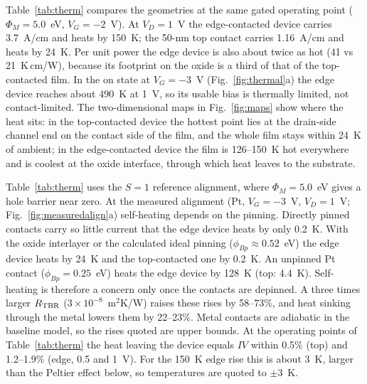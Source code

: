 Table~\ref{tab:therm} compares the geometries at the same gated operating point ($\Phi_M=5.0$~eV, $V_G=-2$~V). At $V_D=1$~V the edge-contacted device carries 3.7~A/cm and heats by 150~K; the 50-nm top contact carries 1.16~A/cm and heats by 24~K. Per unit power the edge device is also about twice as hot (41 vs 21~K\,cm/W), because its footprint on the oxide is a third of that of the top-contacted film. In the on state at $V_G=-3$~V (Fig.~\ref{fig:thermal}a) the edge device reaches about 490~K at 1~V, so its usable bias is thermally limited, not contact-limited. The two-dimensional maps in Fig.~\ref{fig:maps} show where the heat sits: in the top-contacted device the hottest point lies at the drain-side channel end on the contact side of the film, and the whole film stays within 24~K of ambient; in the edge-contacted device the film is 126--150~K hot everywhere and is coolest at the oxide interface, through which heat leaves to the substrate.

Table~\ref{tab:therm} uses the $S=1$ reference alignment, where $\Phi_M=5.0$~eV gives a hole barrier near zero. At the measured alignment (Pt, $V_G=-3$~V, $V_D=1$~V; Fig.~\ref{fig:measuredalign}a) self-heating depends on the pinning. Directly pinned contacts carry so little current that the edge device heats by only 0.2~K. With the oxide interlayer or the calculated ideal pinning ($\phi_{Bp}\approx0.52$~eV) the edge device heats by 24~K and the top-contacted one by 0.2~K. An unpinned Pt contact ($\phi_{Bp}=0.25$~eV) heats the edge device by 128~K (top: 4.4~K). Self-heating is therefore a concern only once the contacts are depinned. A three times larger $R_{\rm TBR}$ ($3\times10^{-8}$~m$^2$K/W) raises these rises by 58--73\%, and heat sinking through the metal lowers them by 22--23\%. Metal contacts are adiabatic in the baseline model, so the rises quoted are upper bounds. At the operating points of Table~\ref{tab:therm} the heat leaving the device equals $IV$ within 0.5\% (top) and 1.2--1.9\% (edge, 0.5 and 1~V). For the 150~K edge rise this is about 3~K, larger than the Peltier effect below, so temperatures are quoted to $\pm3$~K.

